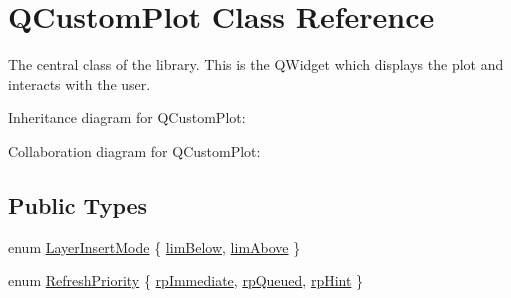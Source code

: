 \hypertarget{class_q_custom_plot}{}\section{Q\+Custom\+Plot Class Reference}
\label{class_q_custom_plot}


The central class of the library. This is the Q\+Widget which displays the plot and interacts with the user.  




Inheritance diagram for Q\+Custom\+Plot\+:


Collaboration diagram for Q\+Custom\+Plot\+:
\subsection*{Public Types}
\begin{DoxyCompactItemize}
\item 
enum \hyperlink{class_q_custom_plot_a75a8afbe6ef333b1f3d47abb25b9add7}{Layer\+Insert\+Mode} \{ \hyperlink{class_q_custom_plot_a75a8afbe6ef333b1f3d47abb25b9add7aee39cf650cd24e68552da0b697ce4a93}{lim\+Below}, 
\hyperlink{class_q_custom_plot_a75a8afbe6ef333b1f3d47abb25b9add7a062b0b7825650b432a713c0df6742d41}{lim\+Above}
 \}
\item 
enum \hyperlink{class_q_custom_plot_a45d61392d13042e712a956d27762aa39}{Refresh\+Priority} \{ \hyperlink{class_q_custom_plot_a45d61392d13042e712a956d27762aa39a0d4831572370d871f2b7cb88806bac59}{rp\+Immediate}, 
\hyperlink{class_q_custom_plot_a45d61392d13042e712a956d27762aa39aaaae083a19bc668597bf0f86e000f798}{rp\+Queued}, 
\hyperlink{class_q_custom_plot_a45d61392d13042e712a956d27762aa39adfa1f2387617168d9299f4c8ad15b332}{rp\+Hint}
 \}
\end{DoxyCompactItemize}
